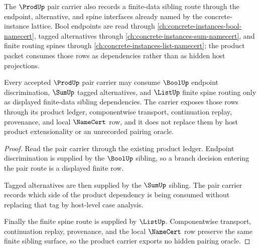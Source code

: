 The $\ProdUp$ pair carrier also records a finite-data sibling route through the endpoint, alternative, and spine interfaces already named by the concrete-instance lattice. Bool endpoints are read through \autoref{ch:concrete-instances-bool-namecert}, tagged alternatives through \autoref{ch:concrete-instances-sum-namecert}, and finite routing spines through \autoref{ch:concrete-instances-list-namecert}; the product packet consumes those rows as dependencies rather than as hidden host projections.

\begin{theorem}
\label{thm:prod-sibling-carrier-route}
Every accepted $\ProdUp$ pair carrier may consume $\BoolUp$ endpoint discrimination, $\SumUp$ tagged alternatives, and $\ListUp$ finite spine routing only as displayed finite-data sibling dependencies. The carrier exposes those rows through its product ledger, componentwise transport, continuation replay, provenance, and local $\NameCert$ row, and it does not replace them by host product extensionality or an unrecorded pairing oracle.
\end{theorem}
\begin{proof}
Read the pair carrier through the existing product ledger. Endpoint discrimination is supplied by the $\BoolUp$ sibling, so a branch decision entering the pair route is a displayed finite row.

Tagged alternatives are then supplied by the $\SumUp$ sibling. The pair carrier records which side of the product dependency is being consumed without replacing that tag by host-level case analysis.

Finally the finite spine route is supplied by $\ListUp$. Componentwise transport, continuation replay, provenance, and the local $\NameCert$ row preserve the same finite sibling surface, so the product carrier exports no hidden pairing oracle.
\end{proof}

